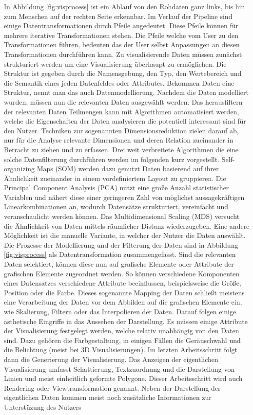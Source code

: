 \documentclass[draft=false
              ,paper=a4
              ,twoside=false
              ,fontsize=11pt
              ,headsepline
              ,BCOR10mm
              ,DIV11
              ]{scrbook}
\begin{document}
In Abbildung \ref{fig:visprocess} ist ein Ablauf von den Rohdaten ganz links, bis hin zum Menschen auf der rechten Seite erkennbar. Im Verlauf der Pipeline sind einige Datentransformationen durch Pfeile angedeutet. Diese Pfeile können für mehrere iterative Transformationen stehen. Die Pfeile welche vom User zu den Transformationen führen, bedeuten das der User selbst Anpassungen an diesen Transformationen durchführen kann. 
Zu visualisierende Daten müssen zunächst strukturiert werden um eine Visualisierung überhaupt zu ermöglichen. Die Struktur ist gegeben durch die Namensgebung, den Typ, den Wertebereich und die Semantik eines jeden Datenfeldes oder Attributes. Bekommen Daten eine Struktur, nennt man das auch Datenmodellierung. Nachdem die Daten modelliert wurden, müssen nun die relevanten Daten ausgewählt werden. Das herausfiltern der relevanten Daten Teilmengen kann mit Algorithmen automatisiert werden, welche die Eigenschaften der Daten analysieren die potentiell interessant sind für den Nutzer. Techniken zur sogenannten Dimensionsreduktion zielen darauf ab, nur für die Analyse relevante Dimensionen und deren Relation zueinander in Betracht zu ziehen und zu erfassen. Drei weit verbreitete Algorithmen die eine solche Datenfilterung durchführen werden im folgenden kurz vorgestellt. Self-organizing Maps (SOM) \cite{kohonen_self-organizing_1998} werden dazu genutzt Daten basierend auf ihrer Ähnlichkeit zueinander in einem vordefiniertem Layout zu gruppieren. Die Principal Component Analysis (PCA) \cite{jolliffe_principal_2010} nutzt eine große Anzahl statistischer Variablen und nähert diese einer geringeren Zahl von möglichst aussagekräftigen Linearkombinationen an, wodurch Datensätze strukturiert, vereinfacht und veranschaulicht werden können. Das Multidimensional Scaling (MDS) \cite{borg_modern_2005} versucht die Ähnlichkeit von Daten mittels räumlicher Distanz wiederzugeben. Eine andere Möglichkeit ist die manuelle Variante, in welcher der Nutzer die Daten auswählt. Die Prozesse der Modellierung und der Filterung der Daten sind in Abbildung \ref{fig:visprocess} als Datentransformation zusammengefasst. Sind die relevanten Daten selektiert, können diese nun auf grafische Elemente oder Attribute der grafischen Elemente zugeordnet werden. So können verschiedene Komponenten eines Datensatzes verschiedene Attribute beeinflussen, beispielsweise die Größe, Position oder die Farbe. Dieses sogenannte Mapping der Daten schließt meistens eine Verarbeitung der Daten vor dem Abbilden auf die grafischen Elemente ein, wie Skalierung, Filtern oder das Interpolieren der Daten. Darauf folgen einige ästhetische Eingriffe in das Aussehen der Darstellung. Es müssen einige Attribute der Visualisierung festgelegt werden, welche relativ unabhängig von den Daten sind. Dazu gehören die Farbgestaltung, in einigen Fällen die Geräuschwahl und die Belichtung (meist bei 3D Visualisierungen). Im letzten Arbeitsschritt folgt dann die Generierung der Visualisierung. Das Anzeigen der eigentlichen Visualisierung umfasst Schattierung, Textzuordnung und die Darstellung von Linien und meist einheitlich geformte Polygone. Dieser Arbeitsschritt wird auch Rendering oder Viewtransformation genannt. Neben der Darstellung der eigentlichen Daten kommen meist noch zusätzliche Informationen zur Unterstüzung des Nutzers 
\end{document}
